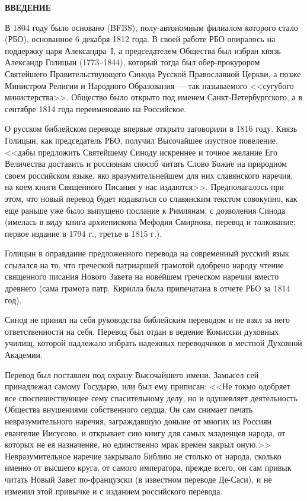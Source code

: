 \pagestyle{fancy}
\thispagestyle{empty}
\begin{center}
\Large\bfseries ВВЕДЕНИЕ\\
\end{center}
\fontsize{12}{15}\selectfont

В 1804 году было основано  (BFBS),
полу-автономным филиалом которого стало  (РБО),
основанное 6 декабря 1812 года.
В своей работе РБО опиралось на поддержку царя Александра~I, а председателем Общества
был избран князь Александр Голицын (1773--1844),
который тогда был обер-прокурором Святейшего Правительствующего Синода
Русской Православной Церкви, а позже Министром Религии и Народного Образования ---
так называемого <<сугубого министерства>>.
Общество было открыто под именем Санкт-Петербургского, а в сентябре 1814 года
переименовано на Российское.

О русском библейском переводе впервые открыто заговорили в 1816 году.
Князь Голицын, как председатель РБО, получил Высочайшее изустное повеление,
<<дабы предложить Святейшему Синоду искреннее и точное желание Его Величества
доставить и россиянам способ читать Слово Божие на природном своем российском
языке, яко вразумительнейшем для них славянского наречия, на коем книги
Священного Писания у нас издаются>>.
Предполагалось при этом, что новый перевод будет издаваться со славянским
текстом совокупно, как еще раньше уже было выпущено послание к Римлянам,
с дозволения Синода (имелась в виду книга архиепископа Мефодия Смирнова,
перевод и толкование; первое издание в 1794 г., третье в 1815 г.).

Голицын в оправдание предложенного перевода на современный русский язык
ссылался на то, что греческой патриаршей грамотой одобрено народу
чтение священного писания Нового Завета на новейшем греческом наречии
вместо древнего (сама грамота патр. Кирилла была припечатана в отчете
РБО за 1814 год).

Синод не принял на себя руководства библейским переводом и не взял за
него ответственности на себя.
Перевод был отдан в ведение Комиссии духовных училищ, которой надлежало
избрать надежных переводчиков в местной Духовной Академии. 

Перевод был поставлен под охрану Высочайшего имени.
Замысел сей принадлежал самому Государю, или был ему приписан:
<<Не токмо одобряет все споспешествующее сему спасительному делу, но и
одушевляет деятельность Общества внушениями собственного сердца.
Он сам снимает печать невразумительного наречия, заграждавшую доныне от
многих из Россиян евангелие Иисусово, и открывает сию книгу для самых
младенцев народа, от которых не ея назначение, но единственно мрак
времен закрыл оную.>>
Невразумительное наречие закрывало Библию не столько
от народа, сколько именно от высшего круга, от самого императора, прежде
всего, он сам привык читать Новый Завет по-французски (в известном
переводе Де-Саси), и не изменил этой привычке и с изданием российского
перевода.

